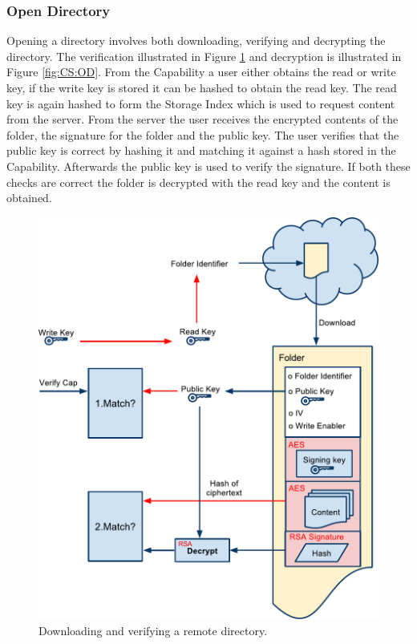 \documentclass[pdftex,english,10pt,b5paper,twoside]{book}
\begin{document}
\subsubsection{Open Directory}

Opening a directory involves both downloading, verifying and decrypting the
directory. The verification  illustrated in Figure \ref{fig:CS:VOD} and
decryption is illustrated in Figure \ref{fig:CS:OD}. From the Capability a user
either obtains the read or write key, if the write key is stored it can be
hashed to obtain the read key. The read key is again hashed to form the Storage
Index which is used to request content from the server. From the server the
user receives the encrypted contents of the folder, the signature for the folder
and the public key. The user verifies that the public key is correct by hashing
it and matching it against a hash stored in the Capability. Afterwards the
public key is used to verify the signature. If both these checks are correct
the folder is decrypted with the read key and the content is obtained.

\begin{figure}[h!]
    \centering
    \includegraphics[width=\columnwidth]{VerifyOpenFolder.pdf}
    \caption{Downloading and verifying a remote directory.}
    \label{fig:CS:VOD}
\end{figure}
\end{document}
